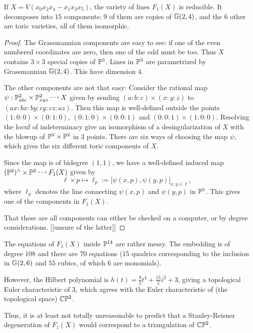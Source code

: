 \documentclass[11pt, english]{article}
\begin{document}
\begin{prop}
If $X=V(x_0x_2x_4-x_1x_3x_5)$, the variety of lines $F_1(X)$ is reducible. It decomposes into $15$ components: $9$ of them are copies of $\mathbb{G}(2,4)$, and the $6$ other are toric varieties, all of them isomorphic.
\end{prop}
\begin{proof}
The Grassmannian components are easy to see: if one of the even numbered coordinates are zero, then one of the odd must be too. Thus $X$ contains $3 \times 3$ special copies of $\mathbb{P}^3$. Lines in $\mathbb{P}^3$ are parametrized by Grassmannian $\mathbb{G}(2,4)$. This have dimension $4$. 

The other components are not that easy: Consider the  rational map $\psi:\PP^2_{abc} \times \PP^2_{xyz} \rmap X$ given by sending $(a:b:c) \times (x:y:z)$ to $(ax:bx:by:cy:cz:az)$. Then this map is well-defined outside the points $(1:0:0) \times (0:1:0)$, $(0:1:0)\times (0:0:1)$ and $(0:0:1)\times(1:0:0)$. Resolving the locuf of indeterminacy give an isomorphism of a desingularization of $X$ with the blowup of $\mathbb{P}^2 \times \mathbb{P}^2$ in $3$ points. There are six ways of choosing the map $\psi$, which gives the six different toric components of $X$. 

Since the map is of bidegree $(1,1)$, we have a well-defined induced map $(\PP^2)^\wedge \times \PP^2 \rmap F_1(X)$ given by
\[
\ell \times p \mapsto \ell_p := \big[\psi(x,p),\psi(y,p)\big]_{x,y \in \ell},
\]
where $\ell_p$ denotes the line connecting $\psi(x,p)$ and $\psi(y,p)$ in $\mathbb{P}^5$. This gives one of the components in $F_1(X)$.


That these are all components can either be checked on a computer, or by degree considerations. [[unsure of the latter]]
\end{proof}

The equations of $F_1(X)$ inside $\mathbb{P}^{14}$ are rather messy. The embedding is of degree $108$ and there are $70$ equations ($15$ quadrics corresponding to the inclusion in $\mathbb{G}(2,6)$ and $55$ cubics, of which $6$ are monomials). 

However, the Hilbert polynomial is $h(t) =\frac 92 t^4 + \frac {15}2 i^2  + 3$, giving a topological Euler characteristic of $3$, which agrees with the Euler characteristic of (the topological space) $\mathbb{C} \mathbb{P}^2$.

Thus, it is at least not totally unreasonable to predict that a Stanley-Reisner degeneration of $F_1(X)$ would correspond to a triangulation of $ \mathbb{C} \mathbb{P} ^ 2$. 
\end{document}
